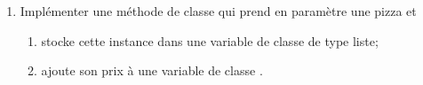 \documentclass[a4paper,12pt,french]{book}
\begin{document}
\begin{exercice}
\begin{enumerate}[\bfseries 1.]
\begin{center}
\begin{tabular}{|c|>{\centering\arraybackslash}m{1.3cm}|}
                    \hline
                \end{tabular}
            \end{center}
            \item     Implémenter une méthode de classe  qui prend en paramètre une pizza et
            \begin{enumerate}[--]
                \item     stocke cette instance dans une variable de classe de type liste;
                \item     ajoute son prix à une variable de classe .
            \end{enumerate}    
        \end{enumerate}
    \end{exercice}
    
\end{document}
